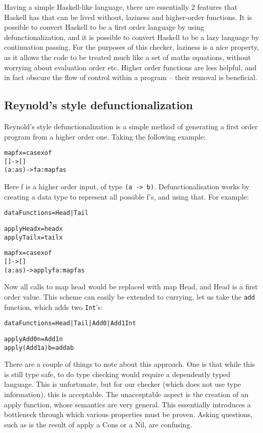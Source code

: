 \documentclass[preprint]{sigplanconf}
\newcommand{\T}[1]{\texttt{#1}}
\newenvironment{code}{\begin{alltt}\small}{\end{alltt}}
\begin{document}
Having a simple Haskell-like language, there are essentially 2 features that
Haskell has that can be lived without, laziness and higher-order functions. It
is possible to convert Haskell to be a first order language by using
defunctionalization, and it is possible to convert Haskell to be a lazy
language by continuation passing. For the purposes of this checker, laziness is
a nice property, as it allows the code to be treated much like a set of maths
equations, without worrying about evaluation order etc. Higher order functions
are less helpful, and in fact obscure the flow of control within a program --
their removal is beneficial.

\subsection{Reynold's style defunctionalization}

Reynold's style defunctionalization is a simple method of generating a first
order program from a higher order one. Taking the following example:

\begin{code}
 map f x = case x of
                [] -> []
                (a:as) -> f a : map f as
\end{code}

Here f is a higher order input, of type \T{(a -> b)}. Defunctionalisation works
by creating a data type to represent all possible f's, and using that. For
example:

\begin{code}
 data Functions = Head | Tail

 apply Head x = head x
 apply Tail x = tail x

 map f x = case x of
     [] -> []
     (a:as) -> apply f a : map f as
\end{code}

Now all calls to map head would be replaced with map Head, and Head is a first
order value. This scheme can easily be extended to currying, let us take the
\T{add} function, which adds two \T{Int}'s:

\begin{code}
 data Functions = Head | Tail | Add0 | Add1 Int

 apply Add0 n = Add1 n
 apply (Add1 a) b = add a b
\end{code}

There are a couple of things to note about this approach. One is that while
this is still type safe, to do type checking would require a dependently typed
language. This is unfortunate, but for our checker (which does not use type
information), this is acceptable. The unacceptable aspect is the creation of an
apply function, whose semantics are very general. This essentially introduces a
bottleneck through which various properties must be proven. Asking questions,
such as is the result of apply a Cons or a Nil, are confusing.
\end{document}
